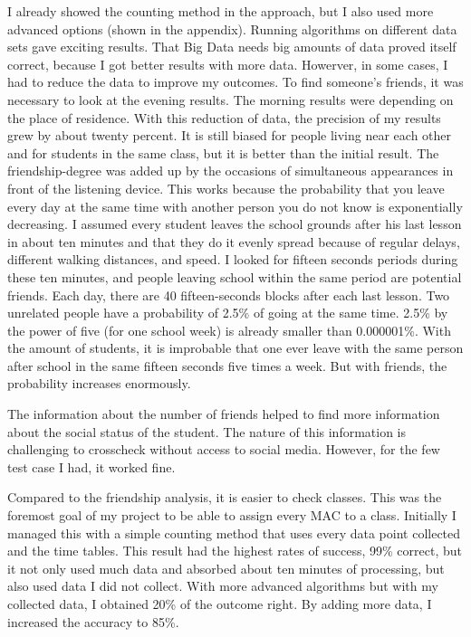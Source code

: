\documentclass[paper=a4, fontsize=11pt]{article}
\begin{document}
I already showed the counting method in the approach, but I also used more advanced options (shown in the appendix). Running algorithms on different data sets gave exciting results. That Big Data needs big amounts of data proved itself correct, because I got better results with more data. Howerver, in some cases, I had to reduce the data to improve my outcomes. To find someone's friends, it was necessary to look at the evening results. The morning results were depending on the place of residence. With this reduction of data, the precision of my results grew by about twenty percent. It is still biased for people living near each other and for students in the same class, but it is better than the initial result. The friendship-degree was added up by the occasions of simultaneous appearances in front of the listening device. This works because the probability that you leave every day at the same time with another person you do not know is exponentially decreasing. I assumed every student leaves the school grounds after his last lesson in about ten minutes and that they do it evenly spread because of regular delays, different walking distances, and speed. I looked for fifteen seconds periods during these ten minutes, and people leaving school within the same period are potential friends. Each day, there are 40 fifteen-seconds blocks after each last lesson. Two unrelated people have a probability of 2.5\% of going at the same time. 2.5\% by the power of five (for one school week) is already smaller than 0.000001\%. With the amount of students, it is improbable that one ever leave with the same person after school in the same fifteen seconds five times a week. But with friends, the probability increases enormously.%

The information about the number of friends helped to find more information about the social status of the student. The nature of this information is challenging to crosscheck without access to social media. However, for the few test case I had, it worked fine.


Compared to the friendship analysis, it is easier to check classes. This was the foremost goal of my project to be able to assign every MAC to a class. Initially I managed this with a simple counting method that uses every data point collected and the time tables. This result had the highest rates of success, 99\% correct, but it not only used much data and absorbed about ten minutes of processing, but also used data I did not collect. With more advanced algorithms but with my collected data, I obtained 20\% of the outcome right. By adding more data, I increased the accuracy to 85\%.
\end{document}
